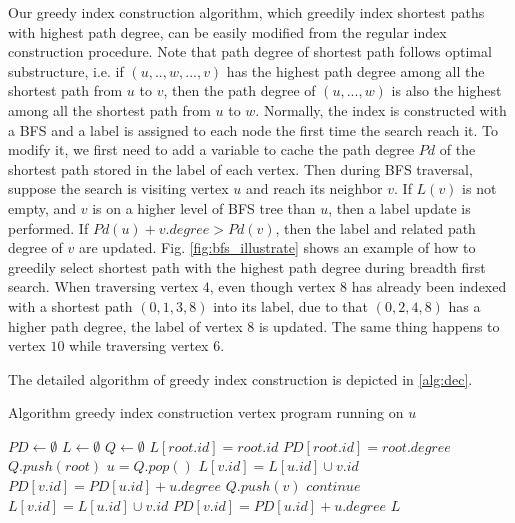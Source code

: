 Our greedy index construction algorithm, which greedily index shortest paths with highest path degree, can be easily modified from the regular index construction procedure. Note that path degree of shortest path follows optimal substructure, i.e. if $(u, .., w, ..., v)$ has the highest path degree among all the shortest path from $u$ to $v$, then the path degree of $(u, ..., w)$ is also the highest among all the shortest path from $u$ to $w$. Normally, the index is constructed with a BFS and a label is assigned to each node the first time the search reach it. To modify it, we first need to add a variable to cache the path degree $Pd$ of the shortest path stored in the label of each vertex. Then during BFS traversal, suppose the search is visiting vertex $u$ and reach its neighbor $v$. If $L(v)$ is not empty, and $v$ is on a higher level of BFS tree than $u$, then a label update is performed. If $Pd(u) + v.degree > Pd(v)$, then the label and related path degree of $v$ are updated. Fig. \ref{fig:bfs_illustrate} shows an example of how to greedily select shortest path with the highest path degree during breadth first search. When traversing vertex $4$, even though vertex $8$ has already been indexed with a shortest path $(0, 1, 3, 8)$ into its label, due to that $(0, 2, 4, 8)$ has a higher path degree, the label of vertex $8$ is updated. The same thing happens to vertex $10$ while traversing vertex $6$.

The detailed algorithm of greedy index construction is depicted in \ref{alg:dec}.

\begin{algorithm}[h]
    \caption{Algorithm greedy index construction vertex program running on $u$}
		\label{alg:ind}
    \begin{algorithmic}
					\State $PD \gets \emptyset$
					\State $L \gets \emptyset$
					\State $Q \gets \emptyset$
					\State $L[root.id] = root.id$
					\State $PD[root.id] = root.degree$
					\State $Q.push(root)$
						\State $u = Q.pop()$
								\State $L[v.id] = L[u.id] \cup v.id$
								\State $PD[v.id] = PD[u.id] + u.degree$
								\State $Q.push(v)$
							\ElsIf{$L(v).size() < L(u).size() + 1$}
								\State $continue$
							\ElsIf{PD[v.id] < PD[u.id] + u.degree}
								\State $L[v.id] = L[u.id] \cup v.id$
								\State $PD[v.id] = PD[u.id] + u.degree$
							\EndIf
						\EndFor
					\EndWhile
					\State \Return $L$
        \EndFunction
    \end{algorithmic}
\end{algorithm}